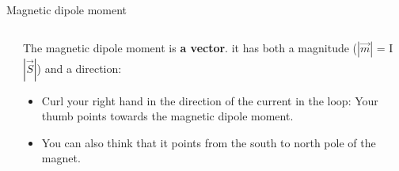\begin{frame}{Magnetic dipole moment}
\begin{columns}
\begin{column}{0.30\textwidth}
\begin{center}
    \end{center}
  \end{column}
  \begin{column}{0.70\textwidth}
  {\small
     The magnetic dipole moment is {\bf a vector}.
     it has both a magnitude ($|\vec{m}|$ = I $|\vec{S}|$) and a direction:
     \begin{itemize}
       \item Curl your right hand in the direction of the current in the loop: Your thumb points towards the magnetic dipole moment.
       \item You can also think that it points from the south to north pole of the magnet.
     \end{itemize}
   }
  \end{column}
\end{columns}

\end{frame}


%
%
%

